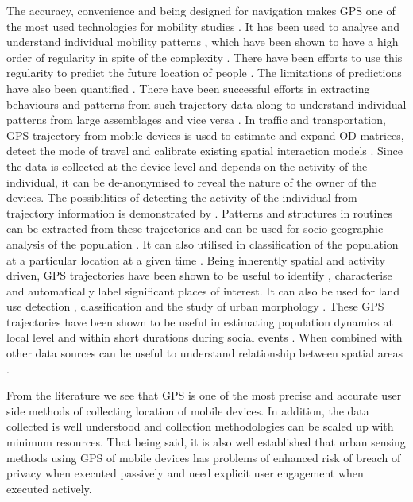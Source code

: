 The accuracy, convenience and being designed for navigation makes GPS one of the most used technologies for mobility studies \cite{gonzalez2008}.
It has been used to analyse and understand individual mobility patterns \citep{neuhaus2009, shin2010}, which have been shown to have a high order of regularity in spite of the complexity \citep{brockmann2006, song2010a}.
There have been efforts to use this regularity to predict the future location of people \citep{monreale2009, calabrese2010}.
The limitations of predictions have also been quantified \citep{song2010}.
There have been successful efforts in extracting behaviours and patterns from such trajectory data \citep{liu2010, cho2011, hoteit2013, pappalardo2013} along to understand individual patterns from large assemblages \citep{giannotti2011, calabrese2013} and vice versa \citep{wirz2012}.
In traffic and transportation, GPS trajectory from mobile devices is used to estimate \citep{calabrese2011} and expand \citep{jing2011} OD matrices, detect the mode of travel \citep{gong2012, rossi2015} and calibrate existing spatial interaction models \citep{yue2012}
.
Since the data is collected at the device level and depends on the activity of the individual, it can be de-anonymised to reveal the nature of the owner of the devices.
The possibilities of detecting the activity of the individual from trajectory information is demonstrated by \citep{liao2006, krumm2007}.
Patterns \citep{jiang2012} and structures in routines \citep{eagle2009} can be extracted from these trajectories and can be used for socio geographic analysis of the population \citep{licoppe2008, chen2018}.
It can also utilised in classification of the population at a particular location at a given time \citep{pappalardo2015}.
Being inherently spatial and activity driven, GPS trajectories have been shown to be useful to identify \citep{bao2012}, characterise \citep{wan2013} and automatically label \citep{do2014} significant places of interest.
It can also be used for land use detection \citep{toole2012, zhang2018}, classification \citep{jiang2015} and the study of urban morphology \citep{kang2012}.
These GPS trajectories have been shown to be useful in estimating population dynamics at local level and within short durations during social events \citep{calabrese2010, kim2014, deville2014}.
When combined with other data sources can be useful to understand relationship between spatial areas \citep{long2015}.

From the literature we see that GPS is one of the most precise and accurate user side methods of collecting location of mobile devices.
In addition, the data collected is well understood and collection methodologies can be scaled up with minimum resources.
That being said, it is also well established that urban sensing methods using GPS of mobile devices has problems of enhanced risk of breach of privacy when executed passively and need explicit user engagement when executed actively.

